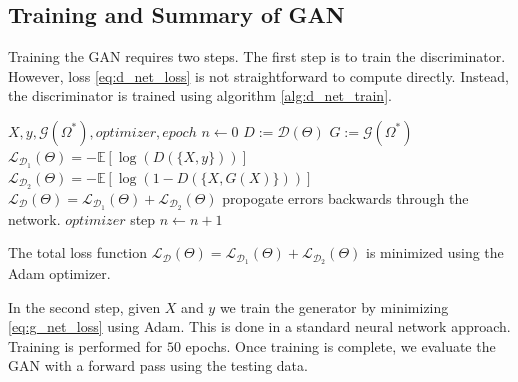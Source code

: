 \documentclass{article}
\theoremstyle{plain}%
\theoremstyle{definition}
\theoremstyle{remark}
\begin{document}
\subsection{Training and Summary of GAN}
Training the GAN requires two steps. The first step is to train the discriminator. However, loss \eqref{eq:d_net_loss} is not straightforward to compute directly. Instead, the discriminator is trained using  algorithm \ref{alg:d_net_train}.
\begin{algorithm}[htpb]
\caption{Discriminator training algorithm}\label{alg:d_net_train}
\begin{algorithmic}
\Require $X,y,\mathcal{G}(\Omega^*), optimizer, epoch$
\State $n \gets 0$
    \State $D := \mathcal{D}(\Theta)$
    \State $G:=\mathcal{G}(\Omega^*)$
    \State $\mathcal{L}_{\mathcal{D}_1}(\Theta) = -\mathbb{E}[\log(D(\{X,y\}))]$
    \State $\mathcal{L}_{\mathcal{D}_2}(\Theta) = -\mathbb{E}[\log(1- D(\{X,G(X)\}))]$
    \State $\mathcal{L}_{\mathcal{D}}(\Theta) = \mathcal{L}_{\mathcal{D}_1}(\Theta) + \mathcal{L}_{\mathcal{D}_2}(\Theta)$
    \State propogate errors backwards through the network.
    \State $optimizer$ step
\EndFor
\State $n \gets n + 1$
\EndWhile
\end{algorithmic}
\end{algorithm}
The total loss function $\mathcal{L}_\mathcal{D}(\Theta) = \mathcal{L}_{\mathcal{D}_1}(\Theta) + \mathcal{L}_{\mathcal{D}_2}(\Theta)$ is minimized using the Adam \citep{kingma-2014} optimizer.

In the second step, given $X$ and $y$ we train the generator by minimizing \eqref{eq:g_net_loss} using Adam. This is done in a standard neural network approach. Training is performed for $50$ epochs. Once training is complete, we evaluate the GAN with a forward pass using the testing data. 
\end{document}
